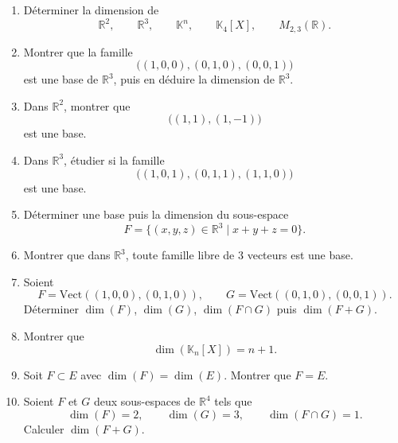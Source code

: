 \documentclass[11pt,a4paper]{article}
\theoremstyle{remark}
\newcommand{\R}{\mathbb{R}}
\newcommand{\K}{\mathbb{K}}
\newcommand{\Vect}{\mathrm{Vect}}
\begin{document}
\begin{enumerate}[label=\textbf{Exercice \arabic*.}]
    \item Déterminer la dimension de
    \[
    \R^2,\qquad \R^3,\qquad \K^n,\qquad \K_4[X],\qquad M_{2,3}(\R).
    \]

    \item Montrer que la famille
    \[
    \big((1,0,0),(0,1,0),(0,0,1)\big)
    \]
    est une base de \(\R^3\), puis en déduire la dimension de \(\R^3\).

    \item Dans \(\R^2\), montrer que
    \[
    \big((1,1),(1,-1)\big)
    \]
    est une base.

    \item Dans \(\R^3\), étudier si la famille
    \[
    \big((1,0,1),(0,1,1),(1,1,0)\big)
    \]
    est une base.

    \item Déterminer une base puis la dimension du sous-espace
    \[
    F=\{(x,y,z)\in\R^3\mid x+y+z=0\}.
    \]

    \item Montrer que dans \(\R^3\), toute famille libre de \(3\) vecteurs est une base.

    \item Soient
    \[
    F=\Vect((1,0,0),(0,1,0)),\qquad G=\Vect((0,1,0),(0,0,1)).
    \]
    Déterminer \(\dim(F)\), \(\dim(G)\), \(\dim(F\cap G)\) puis \(\dim(F+G)\).

    \item Montrer que
    \[
    \dim(\K_n[X])=n+1.
    \]

    \item Soit \(F\subset E\) avec \(\dim(F)=\dim(E)\). Montrer que \(F=E\).

    \item Soient \(F\) et \(G\) deux sous-espaces de \(\R^4\) tels que
    \[
    \dim(F)=2,\qquad \dim(G)=3,\qquad \dim(F\cap G)=1.
    \]
    Calculer \(\dim(F+G)\).
\end{enumerate}
\end{document}
